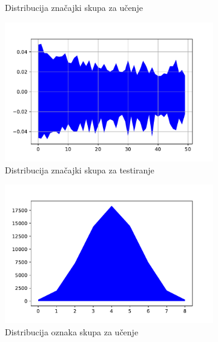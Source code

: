 \documentclass[times, utf8, numeric, diplomski]{fer}
\begin{document}
\begin{figure}[H]
\begin{subfigure}{.5\textwidth}
\centering
\caption{Distribucija značajki skupa za učenje}
\label{fig:dpa4_train_inputs}
\end{subfigure}
\begin{subfigure}{.5\textwidth}
\includegraphics[width=\textwidth]{nl9_ts_inputs.pdf}
\centering
\caption{Distribucija značajki skupa za testiranje}
\label{fig:dpa4_test_inputs}
\end{subfigure}
\begin{subfigure}{.5\textwidth}
\includegraphics[width=\textwidth]{nl9_tr_outputs.pdf}
\centering
\caption{Distribucija oznaka skupa za učenje}
\label{fig:dpa4_train_outputs}
\end{subfigure}
\begin{subfigure}{.5\textwidth}

\end{subfigure}
\end{figure}
\end{document}
